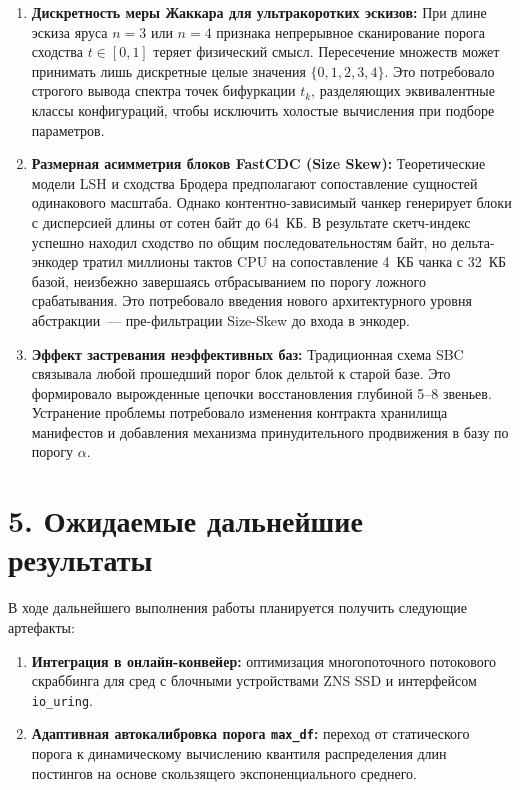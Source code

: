 \documentclass[a4paper,14pt]{extarticle}
\begin{document}
\begin{enumerate}
    \item \textbf{Дискретность меры Жаккара для ультракоротких эскизов:}
    При длине эскиза яруса $n = 3$ или $n = 4$ признака непрерывное сканирование порога сходства $t \in [0, 1]$ теряет физический смысл. Пересечение множеств может принимать лишь дискретные целые значения $\{0, 1, 2, 3, 4\}$. Это потребовало строгого вывода спектра точек бифуркации $t_k$, разделяющих эквивалентные классы конфигураций, чтобы исключить холостые вычисления при подборе параметров.

    \item \textbf{Размерная асимметрия блоков FastCDC (Size Skew):}
    Теоретические модели LSH и сходства Бродера предполагают сопоставление сущностей одинакового масштаба. Однако контентно-зависимый чанкер генерирует блоки с дисперсией длины от сотен байт до 64~КБ. В результате скетч-индекс успешно находил сходство по общим последовательностям байт, но дельта-энкодер тратил миллионы тактов CPU на сопоставление 4~КБ чанка с 32~КБ базой, неизбежно завершаясь отбрасыванием по порогу ложного срабатывания. Это потребовало введения нового архитектурного уровня абстракции~--- пре-фильтрации Size-Skew до входа в энкодер.

    \item \textbf{Эффект застревания неэффективных баз:}
    Традиционная схема SBC связывала любой прошедший порог блок дельтой к старой базе. Это формировало вырожденные цепочки восстановления глубиной 5--8 звеньев. Устранение проблемы потребовало изменения контракта хранилища манифестов и добавления механизма принудительного продвижения в базу по порогу $\alpha$.
\end{enumerate}

\section*{5. Ожидаемые дальнейшие результаты}

В ходе дальнейшего выполнения работы планируется получить следующие артефакты:
\begin{enumerate}
    \item \textbf{Интеграция в онлайн-конвейер:} оптимизация многопоточного потокового скраббинга для сред с блочными устройствами ZNS SSD и интерфейсом \texttt{io\_uring}.
    \item \textbf{Адаптивная автокалибровка порога \texttt{max\_df}:} переход от статического порога к динамическому вычислению квантиля распределения длин постингов на основе скользящего экспоненциального среднего.
\end{enumerate}
\end{document}
